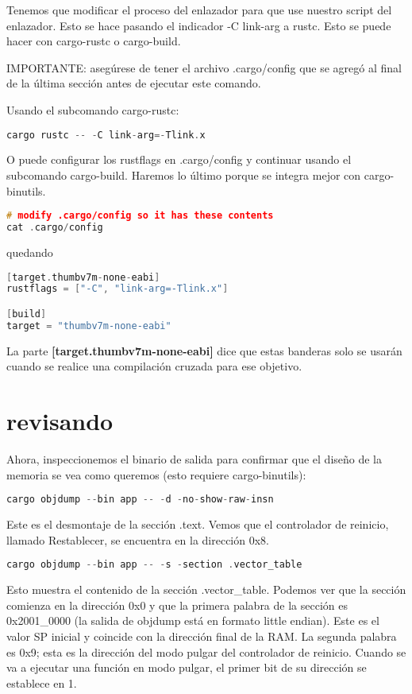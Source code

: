 Tenemos que modificar el proceso del enlazador para que use nuestro script del enlazador. Esto se hace pasando el indicador -C link-arg a rustc. Esto se puede hacer con cargo-rustc o cargo-build.

IMPORTANTE: asegúrese de tener el archivo .cargo/config que se agregó al final de la última sección antes de ejecutar este comando.


Usando el subcomando cargo-rustc:

\begin{lstlisting}[language=c]
	cargo rustc -- -C link-arg=-Tlink.x
\end{lstlisting}


O puede configurar los rustflags en .cargo/config y continuar usando el subcomando cargo-build. Haremos lo último porque se integra mejor con cargo-binutils.

\begin{lstlisting}[language=c]
# modify .cargo/config so it has these contents
cat .cargo/config
\end{lstlisting}

quedando


\begin{lstlisting}[language=c]
[target.thumbv7m-none-eabi]
rustflags = ["-C", "link-arg=-Tlink.x"]

[build]
target = "thumbv7m-none-eabi"
\end{lstlisting}

La parte \textbf{[target.thumbv7m-none-eabi]} dice que estas banderas solo se usarán cuando se realice una compilación cruzada para ese objetivo.


\section{revisando}

Ahora, inspeccionemos el binario de salida para confirmar que el diseño de la memoria se vea como queremos (esto requiere cargo-binutils):

\begin{lstlisting}[language=c]
cargo objdump --bin app -- -d -no-show-raw-insn
\end{lstlisting}

Este es el desmontaje de la sección .text. Vemos que el controlador de reinicio, llamado Restablecer, se encuentra en la dirección 0x8.

\begin{lstlisting}[language=c]
cargo objdump --bin app -- -s -section .vector_table
\end{lstlisting}

Esto muestra el contenido de la sección .vector\_table. Podemos ver que la sección comienza en la dirección 0x0 y que la primera palabra de la sección es 0x2001\_0000 (la salida de objdump está en formato little endian). Este es el valor SP inicial y coincide con la dirección final de la RAM. La segunda palabra es 0x9; esta es la dirección del modo pulgar del controlador de reinicio. Cuando se va a ejecutar una función en modo pulgar, el primer bit de su dirección se establece en 1.
